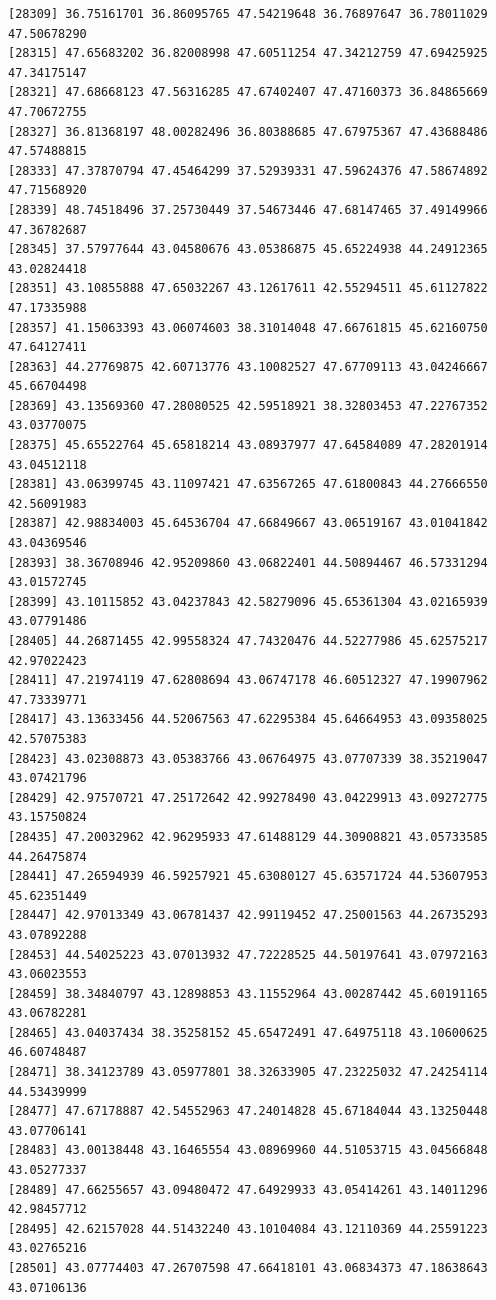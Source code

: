 \documentclass[
  letterpaper,
  DIV=11,
  numbers=noendperiod]{scrartcl}
\begin{document}
\begin{verbatim}
[28309] 36.75161701 36.86095765 47.54219648 36.76897647 36.78011029 47.50678290
[28315] 47.65683202 36.82008998 47.60511254 47.34212759 47.69425925 47.34175147
[28321] 47.68668123 47.56316285 47.67402407 47.47160373 36.84865669 47.70672755
[28327] 36.81368197 48.00282496 36.80388685 47.67975367 47.43688486 47.57488815
[28333] 47.37870794 47.45464299 37.52939331 47.59624376 47.58674892 47.71568920
[28339] 48.74518496 37.25730449 37.54673446 47.68147465 37.49149966 47.36782687
[28345] 37.57977644 43.04580676 43.05386875 45.65224938 44.24912365 43.02824418
[28351] 43.10855888 47.65032267 43.12617611 42.55294511 45.61127822 47.17335988
[28357] 41.15063393 43.06074603 38.31014048 47.66761815 45.62160750 47.64127411
[28363] 44.27769875 42.60713776 43.10082527 47.67709113 43.04246667 45.66704498
[28369] 43.13569360 47.28080525 42.59518921 38.32803453 47.22767352 43.03770075
[28375] 45.65522764 45.65818214 43.08937977 47.64584089 47.28201914 43.04512118
[28381] 43.06399745 43.11097421 47.63567265 47.61800843 44.27666550 42.56091983
[28387] 42.98834003 45.64536704 47.66849667 43.06519167 43.01041842 43.04369546
[28393] 38.36708946 42.95209860 43.06822401 44.50894467 46.57331294 43.01572745
[28399] 43.10115852 43.04237843 42.58279096 45.65361304 43.02165939 43.07791486
[28405] 44.26871455 42.99558324 47.74320476 44.52277986 45.62575217 42.97022423
[28411] 47.21974119 47.62808694 43.06747178 46.60512327 47.19907962 47.73339771
[28417] 43.13633456 44.52067563 47.62295384 45.64664953 43.09358025 42.57075383
[28423] 43.02308873 43.05383766 43.06764975 43.07707339 38.35219047 43.07421796
[28429] 42.97570721 47.25172642 42.99278490 43.04229913 43.09272775 43.15750824
[28435] 47.20032962 42.96295933 47.61488129 44.30908821 43.05733585 44.26475874
[28441] 47.26594939 46.59257921 45.63080127 45.63571724 44.53607953 45.62351449
[28447] 42.97013349 43.06781437 42.99119452 47.25001563 44.26735293 43.07892288
[28453] 44.54025223 43.07013932 47.72228525 44.50197641 43.07972163 43.06023553
[28459] 38.34840797 43.12898853 43.11552964 43.00287442 45.60191165 43.06782281
[28465] 43.04037434 38.35258152 45.65472491 47.64975118 43.10600625 46.60748487
[28471] 38.34123789 43.05977801 38.32633905 47.23225032 47.24254114 44.53439999
[28477] 47.67178887 42.54552963 47.24014828 45.67184044 43.13250448 43.07706141
[28483] 43.00138448 43.16465554 43.08969960 44.51053715 43.04566848 43.05277337
[28489] 47.66255657 43.09480472 47.64929933 43.05414261 43.14011296 42.98457712
[28495] 42.62157028 44.51432240 43.10104084 43.12110369 44.25591223 43.02765216
[28501] 43.07774403 47.26707598 47.66418101 43.06834373 47.18638643 43.07106136

\end{verbatim}
\end{document}
